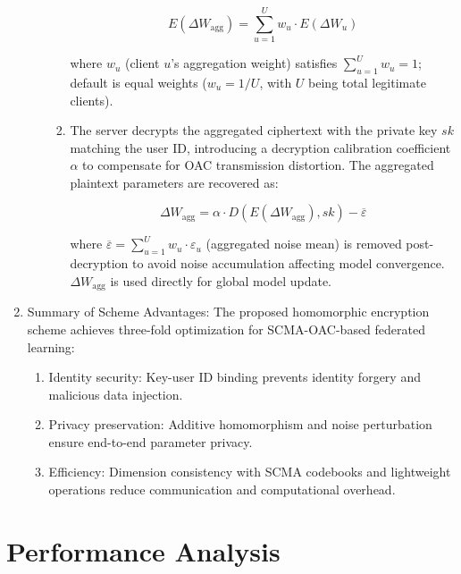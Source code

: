 \documentclass[runningheads]{llncs}
\begin{document}
\begin{enumerate}
\begin{enumerate}
\begin{enumerate}
\[
E(\Delta W_{\text{agg}}) = \sum_{u=1}^U w_u \cdot E(\Delta W_u)\tag{14}
\]

where \(w_u\) (client \(u\)'s aggregation weight) satisfies \(\sum_{u=1}^U w_u = 1\); default is equal weights (\(w_u = 1/U\), with \(U\) being total legitimate clients).

\item The server decrypts the aggregated ciphertext with the private key \(sk\) matching the user ID, introducing a decryption calibration coefficient \(\alpha\) to compensate for OAC transmission distortion. The aggregated plaintext parameters are recovered as:

\begin{equation*}
\Delta W_{\text{agg}} = \alpha \cdot D(E(\Delta W_{\text{agg}}), sk) - \overline{\varepsilon}\tag{15}
\end{equation*}

where \(\overline{\varepsilon} = \sum_{u=1}^U w_u \cdot \varepsilon_u\) (aggregated noise mean) is removed post-decryption to avoid noise accumulation affecting model convergence. \(\Delta W_{\text{agg}}\) is used directly for global model update.
    

\end{enumerate}
\end{enumerate}

\item Summary of Scheme Advantages:
The proposed homomorphic encryption scheme achieves three-fold optimization for SCMA-OAC-based federated learning: 

\begin{enumerate}
\item  Identity security: Key-user ID binding prevents identity forgery and malicious data injection.
\item  Privacy preservation: Additive homomorphism and noise perturbation ensure end-to-end parameter privacy. 
\item  Efficiency: Dimension consistency with SCMA codebooks and lightweight operations reduce communication and computational overhead.
\end{enumerate}
\end{enumerate}







\section{Performance Analysis}
\end{document}
